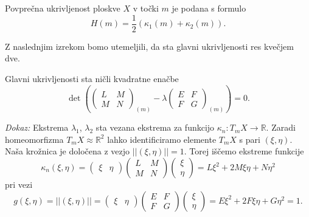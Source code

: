 \begin{definicija}
\label{def_povprecna_ukrivljenost}
    Povprečna ukrivljenost ploskve $X$ v točki $m$ je podana s formulo 
    \begin{equation*} H(m) = \frac{1}{2} (\kappa_1(m) + \kappa_2(m) ).\end{equation*}
\end{definicija}

Z naslednjim izrekom bomo utemeljili, da sta glavni ukrivljenosti res kvečjem dve. 

\begin{izrek}
\label{izr_glavni_ukrivljenosti_sta_nicli_kvadratne_emacbe}
  Glavni ukrivljenosti sta ničli kvadratne enačbe 
  \begin{equation*} \det \left( \begin{pmatrix}
  L & M \\
  M & N
  \end{pmatrix}_{(m)} - \lambda \begin{pmatrix}
  E & F \\
  F & G
  \end{pmatrix}_{(m)}  \right) = 0. \end{equation*}
\end{izrek}
\noindent
{\em Dokaz:\/}
 Ekstrema $\lambda_1$, $\lambda_2$ sta vezana ekstrema za funkcijo $\kappa_n: T_mX \to \mathbb{R}$.
 Zaradi homeomorfizma $T_mX \approx \mathbb{R}^2$ lahko identificiramo elemente $T_mX$ s pari $(\xi, \eta)$. Naša krožnica je
 določena z vezjo $\lvert\lvert (\xi, \eta) \rvert\rvert = 1$. Torej iščemo ekstreme funkcije \begin{equation*}
   \kappa_n(\xi, \eta) = \begin{pmatrix}
     \xi & \eta 
   \end{pmatrix}
   \begin{pmatrix}
     L & M \\
     M & N
   \end{pmatrix}  
   \begin{pmatrix}
     \xi \\
     \eta 
   \end{pmatrix} = L \xi^2 + 2M \xi \eta + N \eta^2
 \end{equation*}  
   pri vezi \begin{equation*}
     g(\xi, \eta)  = \lvert\lvert (\xi, \eta) \rvert\rvert = \begin{pmatrix}
       \xi & \eta 
     \end{pmatrix}
     \begin{pmatrix}
       E & F \\
       F & G
     \end{pmatrix}  
     \begin{pmatrix}
       \xi \\
       \eta 
     \end{pmatrix} = E \xi^2 + 2F \xi \eta + G \eta^2 = 1.
   \end{equation*}  
